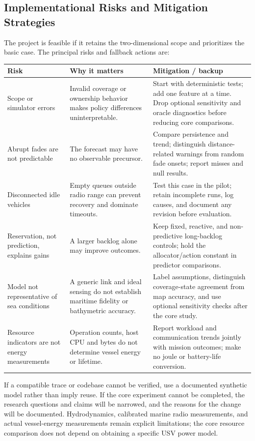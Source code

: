 \subsection{Implementational Risks and Mitigation Strategies}
The project is feasible if it retains the two-dimensional scope and prioritizes the basic case. The principal risks and fallback actions are:

{\small{}
\begin{tabularx}{\linewidth}{@{}p{2.5cm}Y Y@{}}
\toprule
Risk & Why it matters & Mitigation / backup\\
\midrule
Scope or simulator errors & Invalid coverage or ownership behavior makes policy differences uninterpretable. & Start with deterministic tests; add one feature at a time. Drop optional sensitivity and oracle diagnostics before reducing core comparisons.\\
Abrupt fades are not predictable & The forecast may have no observable precursor. & Compare persistence and trend; distinguish distance-related warnings from random fade onsets; report misses and null results.\\
Disconnected idle vehicles & Empty queues outside radio range can prevent recovery and dominate timeouts. & Test this case in the pilot; retain incomplete runs, log causes, and document any revision before evaluation.\\
Reservation, not prediction, explains gains & A larger backlog alone may improve outcomes. & Keep fixed, reactive, and non-predictive long-backlog controls; hold the allocator/action constant in predictor comparisons.\\
Model not representative of sea conditions & A generic link and ideal sensing do not establish maritime fidelity or bathymetric accuracy. & Label assumptions, distinguish coverage-state agreement from map accuracy, and use optional sensitivity checks after the core study.\\
Resource indicators are not energy measurements & Operation counts, host CPU and bytes do not determine vessel energy or lifetime. & Report workload and communication trends jointly with mission outcomes; make no joule or battery-life conversion.\\
\bottomrule
\end{tabularx}\par}

If a compatible trace or codebase cannot be verified, use a documented synthetic model rather than imply reuse. If the core experiment cannot be completed, the research questions and claims will be narrowed, and the reasons for the change will be documented. Hydrodynamics, calibrated marine radio measurements, and actual vessel-energy measurements remain explicit limitations; the core resource comparison does not depend on obtaining a specific USV power model.
